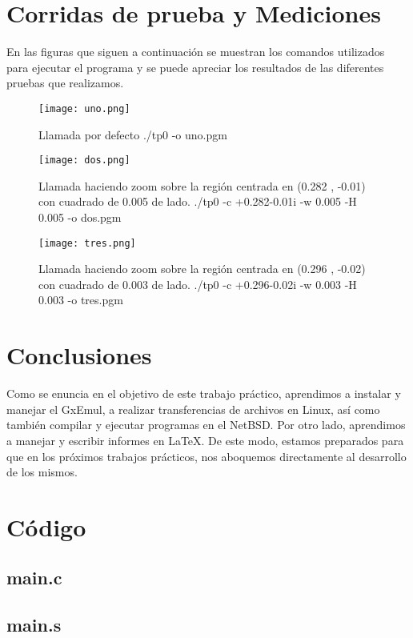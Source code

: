 \documentclass[a4paper,10pt,oneside]{article}
\begin{document}
	
\section{Corridas de prueba y Mediciones}

	En las figuras que siguen a continuación se muestran los comandos utilizados para ejecutar el programa y se puede apreciar los resultados de las diferentes pruebas que realizamos.	
	\begin{figure}[H]
		\begin{center}
			\texttt{[image: uno.png]}
		\end{center}
		\caption{Llamada por defecto ./tp0 -o uno.pgm} \label{Figura 1}
	\end{figure}

	\begin{figure}[H]
		\begin{center}
			\texttt{[image: dos.png]}
		\end{center}
		\caption{Llamada haciendo zoom sobre la región centrada en (0.282 , -0.01) con cuadrado de 0.005 de lado. ./tp0 -c +0.282-0.01i -w 0.005 -H 0.005 -o dos.pgm } \label{Figura 2}
	\end{figure}

	\begin{figure}[H]
		\begin{center}
			\texttt{[image: tres.png]}
		\end{center}
		\caption{Llamada haciendo zoom sobre la región centrada en (0.296 , -0.02) con cuadrado de 0.003 de lado. ./tp0 -c +0.296-0.02i -w 0.003 -H 0.003 -o tres.pgm } \label{Figura 3}
	\end{figure}
	
	\newpage

\section{Conclusiones}	
	Como se enuncia en el objetivo de este trabajo práctico, aprendimos a instalar y manejar el GxEmul, a realizar transferencias de archivos en Linux, así como también compilar y ejecutar programas en el NetBSD. Por otro lado,  aprendimos a manejar y escribir informes en \LaTeX{}.
	De este modo, estamos preparados para que en los próximos trabajos prácticos, nos aboquemos directamente al desarrollo de los mismos.


\newpage 
\section{Código}
\subsection{main.c}
\lstset{ language = c }


\newpage 

\subsection{main.s}
\lstset{ language = [x86masm]assembler }

\end{document}
